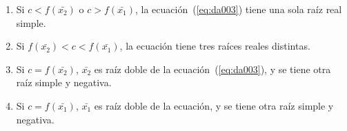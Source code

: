 \begin{exemplo}[Solución]
\begin{enumerate}
    \begin{enumerate}
    \item Si $c<f(\bar{x_2})$ o $c>f(\bar{x_1})$, la ecuación~(\ref{eq:da003}) tiene una
        sola raíz real simple.

    \item Si $f(\bar{x_2})<c<f(\bar{x_1})$, la ecuación tiene tres  raíces reales
        distintas.

    \item Si $c=f(\bar{x_2})$, $\bar{x_2}$ es raíz doble de la ecuación~(\ref{eq:da003}), y
        se tiene otra raíz simple y negativa.

    \item Si $c=f(\bar{x_1})$, $\bar{x_1}$ es raíz doble de la ecuación, y se tiene otra
        raíz simple y negativa.
    \end{enumerate}

\end{enumerate}
\end{exemplo}

